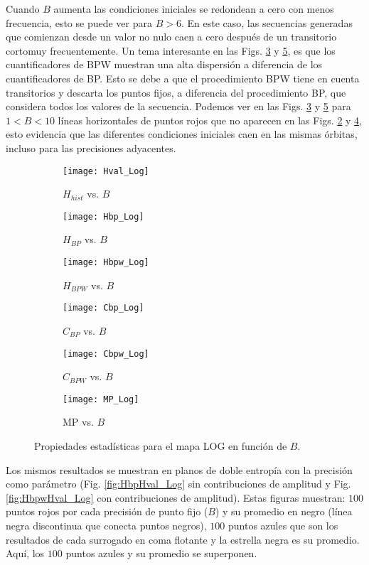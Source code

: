 Cuando $B$ aumenta las condiciones iniciales se redondean a cero con menos frecuencia, esto se puede ver para $B > 6$.
En este caso, las secuencias generadas que comienzan desde un valor no nulo caen a cero después de un transitorio cortomuy frecuentemente.
Un tema interesante en las Figs. \ref{fig:Hbpw_Log} y \ref{fig:Cbpw_Log}, es que los cuantificadores de BPW muestran una alta dispersión a diferencia de los cuantificadores de BP.
Esto se debe a que el procedimiento BPW tiene en cuenta transitorios y descarta los puntos fijos, a diferencia del procedimiento BP, que considera todos los valores de la secuencia.
Podemos ver en las Figs. \ref{fig:Hbpw_Log} y \ref{fig:Cbpw_Log} para $1 < B < 10$ líneas horizontales de puntos rojos que no aparecen en las Figs. \ref{fig:Hbp_Log} y \ref{fig:Cbp_Log}, esto evidencia que las diferentes condiciones iniciales caen en las mismas órbitas, incluso para las precisiones adyacentes.
%
\begin{figure}[htpb]
	\centering
	\begin{subfigure}[b]{0.49\textwidth}
		\texttt{[image: Hval\_Log]}
		\caption{$H_{hist}$ vs. $B$}
		\label{fig:Hval_Log}
	\end{subfigure}
	\begin{subfigure}[b]{0.49\textwidth}
		\texttt{[image: Hbp\_Log]}
		\caption{$H_{BP}$ vs. $B$}
		\label{fig:Hbp_Log}
	\end{subfigure}
	\begin{subfigure}[b]{0.49\textwidth}
		\texttt{[image: Hbpw\_Log]}
		\caption{$H_{BPW}$ vs. $B$}
		\label{fig:Hbpw_Log}
	\end{subfigure}
	\begin{subfigure}[b]{0.49\textwidth}
		\texttt{[image: Cbp\_Log]}
		\caption{$C_{BP}$ vs. $B$}
		\label{fig:Cbp_Log}
	\end{subfigure}
	\begin{subfigure}[b]{0.49\textwidth}
		\texttt{[image: Cbpw\_Log]}
		\caption{$C_{BPW}$ vs. $B$}
		\label{fig:Cbpw_Log}
	\end{subfigure}
	\begin{subfigure}[b]{0.49\textwidth}
		\texttt{[image: MP\_Log]}
		\caption{MP vs. $B$}
		\label{fig:MP_Log}
	\end{subfigure}
	\caption{Propiedades estadísticas para el mapa LOG en función de $B$.}
	\label{fig:LOG_QuantiB}
\end{figure}

Los mismos resultados se muestran en planos de doble entropía con la precisión como parámetro (Fig. \ref{fig:HbpHval_Log} sin contribuciones de amplitud y Fig. \ref{fig:HbpwHval_Log} con contribuciones de amplitud).
Estas figuras muestran: $100$ puntos rojos por cada precisión de punto fijo ($B$) y su promedio en negro (línea negra discontinua que conecta puntos negros), $100$ puntos azules que son los resultados de cada surrogado en coma flotante y la estrella negra es su promedio.
Aquí, los $100$ puntos azules y su promedio se superponen.

